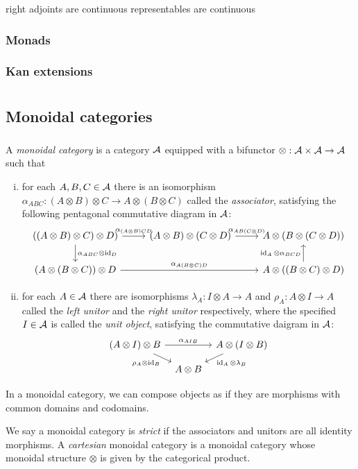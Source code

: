 \documentclass{../../large}
\begin{document}
right adjoints are continuous
representables are continuous
\section{Monads}

\section{Kan extensions}


\part{}


\chapter{Monoidal categories}

\section{}

\begin{prb}
A \emph{monoidal category} is a category $\mathcal{A}$ equipped with a bifunctor $\otimes:\mathcal{A}\times\mathcal{A}\to\mathcal{A}$ such that
\begin{enumerate}[(i)]
\item for each $A,B,C\in\mathcal{A}$ there is an isomorphism $\alpha_{ABC}:(A\otimes B)\otimes C\to A\otimes(B\otimes C)$ called the \emph{associator}, satisfying the following pentagonal commutative diagram in $\mathcal{A}$:
\[\begin{tikzcd}
((A\otimes B)\otimes C)\otimes D) \rar{\alpha_{(A\otimes B)CD}} \dar{\alpha_{ABC}\otimes\id_D} &
(A\otimes B)\otimes(C\otimes D) \rar{\alpha_{AB(C\otimes D)}} &
A\otimes(B\otimes(C\otimes D))\\
(A\otimes(B\otimes C))\otimes D \ar{rr}{\alpha_{A(B\otimes C)D}} &&
A\otimes((B\otimes C)\otimes D) \uar{\id_A\otimes\alpha_{BCD}}
\end{tikzcd}\]
\item for each $A\in\mathcal{A}$ there are isomorphisms $\lambda_A:I\otimes A\to A$ and $\rho_A:A\otimes I\to A$ called the \emph{left unitor} and the \emph{right unitor} respectively, where the specified $I\in\mathcal{A}$ is called the \emph{unit object}, satisfying the commutative daigram in $\mathcal{A}$:
\[\begin{tikzcd}[row sep=small,column sep=tiny]
(A\otimes I)\otimes B \ar{rr}{\alpha_{AIB}} \ar[swap]{dr}{\rho_A\otimes\id_B} &&
A\otimes(I\otimes B) \ar{dl}{\id_A\otimes\lambda_B}\\
& A\otimes B &
\end{tikzcd}\]
\end{enumerate}
In a monoidal category, we can compose objects as if they are morphisms with common domains and codomains.

We say a monoidal category is \emph{strict} if the associators and unitors are all identity morphisms.
A \emph{cartesian} monoidal category is a monoidal category whose monoidal structure $\otimes$ is given by the categorical product.
\end{prb}
\end{document}
